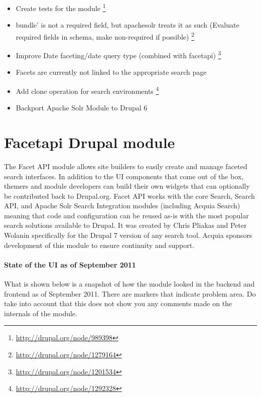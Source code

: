 \begin{itemize}
\item Create tests for the module \footnote{\url{http://drupal.org/node/989398}}
\item bundle' is not a required field, but apachesolr treats it as such (Evaluate required fields in schema, make non-required if possible) \footnote{\url{http://drupal.org/node/1279164}}
\item Improve Date faceting/date query type (combined with facetapi) \footnote{\url{http://drupal.org/node/1201534}}
\item Facets are currently not linked to the appropriate search page
\item Add clone operation for search environments \footnote{\url{http://drupal.org/node/1292328}}
\item Backport Apache Solr Module to Drupal 6
\end{itemize}

\section{Facetapi Drupal module}
The Facet API module allows site builders to easily create and manage faceted search interfaces. In addition to the UI components that come out of the box, themers and module developers can build their own widgets that can optionally be contributed back to Drupal.org. Facet API works with the core Search, Search API, and Apache Solr Search Integration modules (including Acquia Search) meaning that code and configuration can be reused as-is with the most popular search solutions available to Drupal. It was created by Chris Pliakas and Peter Wolanin specifically for the Drupal 7 version of any search tool. Acquia sponsors development of this module to ensure continuity and support.

\paragraph{State of the UI as of September 2011} What is shown below is a snapshot of how the module looked in the backend and frontend as of September 2011. There are markers that indicate problem area. Do take into account that this does not show you any comments made on the internals of the module.

